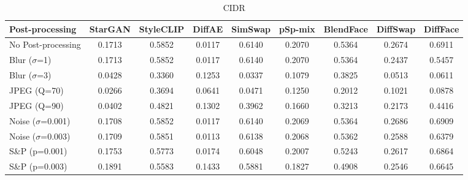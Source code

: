 \documentclass{article}
\begin{document}
\begin{table}[h!]
\begin{subtable}{\textwidth}
\caption{CIDR}
\centering
\scriptsize
\begin{tabular}{lcccccccc}
\toprule
\textbf{Post-processing} & StarGAN & StyleCLIP & DiffAE & SimSwap & pSp-mix & BlendFace & DiffSwap & DiffFace \\
\midrule
No Post-processing & 0.1713 & 0.5852 & 0.0117 & 0.6140 & 0.2070 & 0.5364 & 0.2674 & 0.6911 \\
\midrule
Blur ($\sigma$=1) & 0.1713 & 0.5852 & 0.0117 & 0.6140 & 0.2070 & 0.5364 & 0.2437 & 0.5457 \\
Blur ($\sigma$=3) & 0.0428 & 0.3360 & 0.1253 & 0.0337 & 0.1079 & 0.3825 & 0.0513 & 0.0611 \\
JPEG (Q=70) & 0.0266 & 0.3694 & 0.0641 & 0.0471 & 0.1250 & 0.2012 & 0.1021 & 0.0878 \\
JPEG (Q=90) & 0.0402 & 0.4821 & 0.1302 & 0.3962 & 0.1660 & 0.3213 & 0.2173 & 0.4416 \\
Noise ($\sigma$=0.001) & 0.1708 & 0.5852 & 0.0117 & 0.6140 & 0.2069 & 0.5364 & 0.2686 & 0.6909 \\
Noise ($\sigma$=0.003) & 0.1709 & 0.5851 & 0.0113 & 0.6138 & 0.2068 & 0.5362 & 0.2588 & 0.6379 \\
S\&P (p=0.001) & 0.1753 & 0.5773 & 0.0174 & 0.6048 & 0.2007 & 0.5243 & 0.2617 & 0.6864 \\
S\&P (p=0.003) & 0.1891 & 0.5583 & 0.1433 & 0.5881 & 0.1827 & 0.4908 & 0.2546 & 0.6645 \\
\bottomrule
\end{tabular}
\end{subtable}


\end{table}
\end{document}
